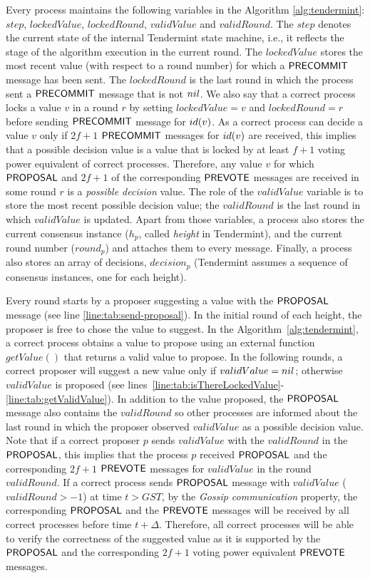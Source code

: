 Every process maintains the following variables in the Algorithm
\ref{alg:tendermint}: $step$, $lockedValue$, $lockedRound$, $validValue$ and
$validRound$. The $step$ denotes the current state of the internal Tendermint
state machine, i.e., it reflects the stage of the algorithm execution in the
current round. The $lockedValue$ stores the most recent value (with respect to
a round number) for which a $\Precommit$ message has been sent. The
$lockedRound$ is the last round in which the process sent a $\Precommit$
message that is not $\nil$. We also say that a correct process locks a value
$v$ in a round $r$ by setting $lockedValue = v$ and $lockedRound = r$ before
sending $\Precommit$ message for $\id(v)$. As a correct process can decide a
value $v$ only if $2f+1$ $\Precommit$ messages for $\id(v)$ are received, this
implies that a possible decision value is a value that is locked by at least
$f+1$ voting power equivalent of correct processes. Therefore, any value $v$
for which $\Proposal$ and $2f+1$ of the corresponding $\Prevote$ messages are
received in some round $r$ is a \emph{possible decision} value. The role of the
$validValue$ variable is to store the most recent possible decision value; the
$validRound$ is the last round in which $validValue$ is updated. Apart from
those variables, a process also stores the current consensus instance ($h_p$,
called \emph{height} in Tendermint), and the current round number ($round_p$)
and attaches them to every message. Finally, a process also stores an array of
decisions, $decision_p$ (Tendermint assumes a sequence of consensus instances,
one for each height).

Every round starts by a proposer suggesting a value with the $\Proposal$
message (see line \ref{line:tab:send-proposal}). In the initial round of each
height, the proposer is free to chose the value to suggest. In the
Algorithm~\ref{alg:tendermint}, a correct process obtains a value to propose
using an external function    $getValue()$ that returns a valid value to
propose. In the following rounds, a correct proposer will suggest a new value
only if $validValue = \nil$; otherwise $validValue$ is proposed (see
lines~\ref{line:tab:isThereLockedValue}-\ref{line:tab:getValidValue}). 
In addition to the value proposed, the $\Proposal$ message also
contains the $validRound$ so other processes are informed about the last round
in which the proposer observed $validValue$ as a possible decision value.
Note that if a correct proposer $p$ sends $validValue$ with the $validRound$ in the
$\Proposal$, this implies that the process $p$ received $\Proposal$ and the
corresponding $2f+1$ $\Prevote$ messages for $validValue$ in the round
$validRound$. 
If a correct process sends $\Proposal$ message with $validValue$ ($validRound > -1$)
at time $t > GST$, by the \emph{Gossip communication} property, the
corresponding $\Proposal$ and the $\Prevote$ messages will be received by all
correct processes before time $t+\Delta$. Therefore, all correct processes will
be able to verify the correctness of the suggested value as it is supported by
the $\Proposal$ and the corresponding $2f+1$ voting power equivalent $\Prevote$
messages.   

